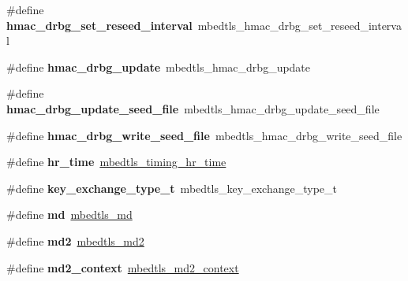 \begin{DoxyCompactItemize}
\item 
\mbox{\label{compat-1_83_8h_a087bcd6c0c56adb9504dd3c99fe7ef10}} 
\#define {\bfseries hmac\+\_\+drbg\+\_\+set\+\_\+reseed\+\_\+interval}~mbedtls\+\_\+hmac\+\_\+drbg\+\_\+set\+\_\+reseed\+\_\+interval
\item 
\mbox{\label{compat-1_83_8h_af20facd5dc049dcf8adbb621e419fe89}} 
\#define {\bfseries hmac\+\_\+drbg\+\_\+update}~mbedtls\+\_\+hmac\+\_\+drbg\+\_\+update
\item 
\mbox{\label{compat-1_83_8h_a1ffc2bde5a15ce6b17c2ed4d7160d472}} 
\#define {\bfseries hmac\+\_\+drbg\+\_\+update\+\_\+seed\+\_\+file}~mbedtls\+\_\+hmac\+\_\+drbg\+\_\+update\+\_\+seed\+\_\+file
\item 
\mbox{\label{compat-1_83_8h_ac44be22985d78e772a6c8681a748fddf}} 
\#define {\bfseries hmac\+\_\+drbg\+\_\+write\+\_\+seed\+\_\+file}~mbedtls\+\_\+hmac\+\_\+drbg\+\_\+write\+\_\+seed\+\_\+file
\item 
\mbox{\label{compat-1_83_8h_a7d6d2dba30ab5608bed7a872e3aee565}} 
\#define {\bfseries hr\+\_\+time}~\mbox{\hyperlink{structmbedtls__timing__hr__time}{mbedtls\+\_\+timing\+\_\+hr\+\_\+time}}
\item 
\mbox{\label{compat-1_83_8h_ada8ec4e8c5a2dfd2733222250a5ded90}} 
\#define {\bfseries key\+\_\+exchange\+\_\+type\+\_\+t}~mbedtls\+\_\+key\+\_\+exchange\+\_\+type\+\_\+t
\item 
\mbox{\label{compat-1_83_8h_aa259673bd7996b881b0754e3d35f09b6}} 
\#define {\bfseries md}~\mbox{\hyperlink{md_8h_a36c5d8bda1905e0434708f0ef5912dda}{mbedtls\+\_\+md}}
\item 
\mbox{\label{compat-1_83_8h_af3686fffe8ff04cf3441472f888261a9}} 
\#define {\bfseries md2}~\mbox{\hyperlink{md2_8h_ae38f7d94f0e578afdf640e99eb68135d}{mbedtls\+\_\+md2}}
\item 
\mbox{\label{compat-1_83_8h_a41f9a90cc8c8e395ce09cd0ce03ca6ae}} 
\#define {\bfseries md2\+\_\+context}~\mbox{\hyperlink{structmbedtls__md2__context}{mbedtls\+\_\+md2\+\_\+context}}
\item 

\end{DoxyCompactItemize}
